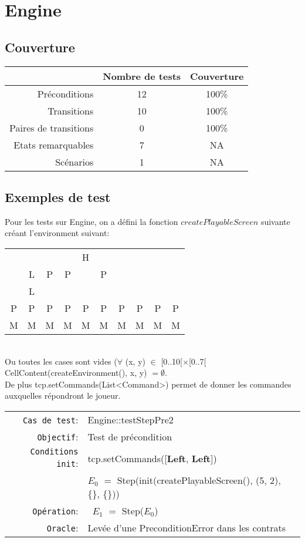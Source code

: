 \documentclass{article}
\begin{document}
\section{Engine}

\subsection{Couverture}

\begin{longtable}{r|cc}
  &Nombre de tests&Couverture\\
  \hline
  Préconditions & 12 & 100\%\\
  Transitions & 10 & 100\%\\
  Paires de transitions & 0 & 100\%\\
  Etats remarquables & 7 & NA\\
  Scénarios & 1 & NA\\
\end{longtable}

\subsection{Exemples de test}

Pour les tests sur Engine, on a défini la fonction $createPlayableScreen$ suivante créant l'environment suivant:\\
\begin{tabular}{cccccccccc}
   & & & &H& & & & & \\
   &L&P&P& &P& & & & \\
   &L& & & & & & & & \\
  P&P&P&P&P&P&P&P&P&P\\
  M&M&M&M&M&M&M&M&M&M
\end{tabular}\\
\noindent Ou toutes les cases sont vides ($\forall$ (x, y) $\in$ [0..10[$\times$[0..7[ \textrm{CellContent(createEnvironment(), x, y)} $= \emptyset$.\\
De plus \textrm{tcp.setCommands(List<Command>)} permet de donner les commandes auxquelles répondront le joueur.

{\small
  \begin{longtable}{rl}
    \texttt{Cas de test}: &\textrm{Engine::testStepPre2}\\
    \texttt{Objectif}: & Test de précondition\\
    \texttt{Conditions init}: & \textrm{tcp.setCommands([\textbf{Left}, \textbf{Left}])}\\
    & $E_0$ $=$ \textrm{Step(init(createPlayableScreen(), (5, 2), \{\}, \{\}))}\\
    \texttt{Opération}: &\ $E_1$ $=$ \textrm{Step($E_0$)}\\
    \texttt{Oracle}: & Levée d'une \textrm{PreconditionError} dans les contrats\\
  \end{longtable}}
\end{document}
